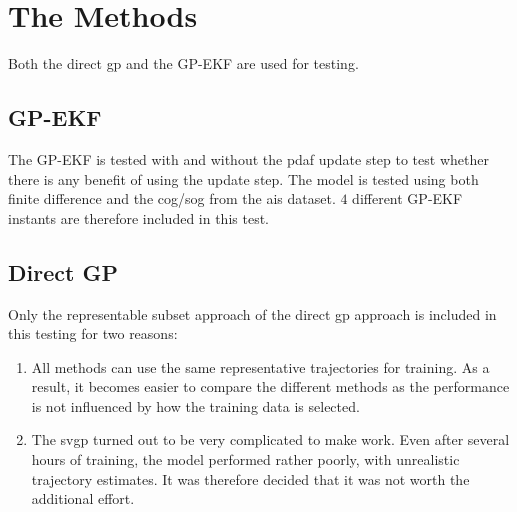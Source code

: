 \section{The Methods}
Both the direct \acrshort{gp} and the GP-EKF are used for testing.

\subsection{GP-EKF}
The GP-EKF is tested with and without the \acrshort{pdaf} update step to test whether there is any benefit of using the update step. The model is tested using both finite difference and the \acrshort{cog}/\acrshort{sog} from the \acrshort{ais} dataset. $4$ different GP-EKF instants are therefore included in this test.

\subsection{Direct GP}
Only the representable subset approach of the direct \acrshort{gp} approach is included in this testing for two reasons:
\begin{enumerate}
    \item All methods can use the same representative trajectories for training. As a result, it becomes easier to compare the different methods as the performance is not influenced by how the training data is selected.
    \item The \acrshort{svgp} turned out to be very complicated to make work. Even after several hours of training, the model performed rather poorly, with unrealistic trajectory estimates. It was therefore decided that it was not worth the additional effort.
\end{enumerate}

